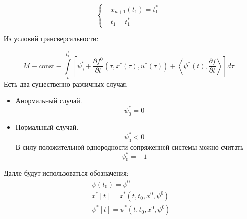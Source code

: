 \documentclass[oneside, final, 14pt, draft]{article}
\theoremstyle{definition}
\theoremstyle{definition}
\theoremstyle{remark}
\theoremstyle{theorem}
\begin{document}
\begin{equation*}
\begin{cases}
&x_{n+1}(t_1) = t_1^*\\
&t_1 = t_1^*
\end{cases}
\end{equation*}

Из условий трансверсальности:

$$ M \equiv \mathrm{const} - \int\limits_t^{t_1^*}\left[ \psi_0^* + \frac{\partial f^0}{\partial t}(\tau, x^*(\tau), u^*(\tau)) +\left\langle \psi^*(t), \frac{\partial f}{\partial t}\right\rangle\right]d\tau$$
Есть два существенно различных случая.
\begin{itemize}
\item Анормальный случай. $$\psi_0^* = 0$$
\item Нормальный случай. $$\psi_0^* < 0$$
В силу положительной однородности сопряженной системы можно считать $$\psi_0^* = -1$$
\end{itemize}
   
Далле будут использоваться обозначения:
\begin{align*}
&\psi(t_0) = \psi^0\\
&x^*[t] = x^* (t, t_0, x^0, \psi^0)\\
&\psi^*[t] = \psi^*(t, t_0, x^0, \psi^0)
\end{align*}
\end{document}
